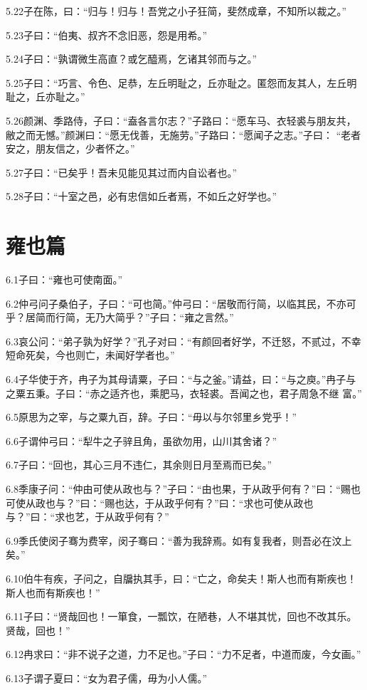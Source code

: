 \documentclass[a4paper,12pt,UTF8,twoside]{ctexbook}
\begin{document}
5.22子在陈，曰：“归与！归与！吾党之小子狂简，斐然成章，不知所以裁之。”

5.23子曰：“伯夷、叔齐不念旧恶，怨是用希。”

5.24子曰：“孰谓微生高直？或乞醯焉，乞诸其邻而与之。”

5.25子曰：“巧言、令色、足恭，左丘明耻之，丘亦耻之。匿怨而友其人，左丘明耻之，丘亦耻之。”

5.26颜渊、季路侍，子曰：“盍各言尔志？”子路曰：“愿车马、衣轻裘与朋友共，敝之而无憾。”颜渊曰：“愿无伐善，无施劳。”子路曰：“愿闻子之志。”子曰：
“老者安之，朋友信之，少者怀之。”

5.27子曰：“已矣乎！吾未见能见其过而内自讼者也。”

5.28子曰：“十室之邑，必有忠信如丘者焉，不如丘之好学也。”


\chapter{雍也篇}
6.1子曰：“雍也可使南面。”

6.2仲弓问子桑伯子，子曰：“可也简。”仲弓曰：“居敬而行简，以临其民，不亦可乎？居简而行简，无乃大简乎？”子曰：“雍之言然。”

6.3哀公问：“弟子孰为好学？”孔子对曰：“有颜回者好学，不迁怒，不贰过，不幸短命死矣，今也则亡，未闻好学者也。”

6.4子华使于齐，冉子为其母请粟，子曰：“与之釜。”请益，曰：“与之庾。”冉子与之粟五秉。子曰：“赤之适齐也，乘肥马，衣轻裘。吾闻之也，君子周急不继
富。”

6.5原思为之宰，与之粟九百，辞。子曰：“毋以与尔邻里乡党乎！”

6.6子谓仲弓曰：“犁牛之子骍且角，虽欲勿用，山川其舍诸？”

6.7子曰：“回也，其心三月不违仁，其余则日月至焉而已矣。”

6.8季康子问：“仲由可使从政也与？”子曰：“由也果，于从政乎何有？”曰：“赐也可使从政也与？”曰：“赐也达，于从政乎何有？”曰：“求也可使从政也与？”曰：“求也艺，于从政乎何有？”

6.9季氏使闵子骞为费宰，闵子骞曰：“善为我辞焉。如有复我者，则吾必在汶上矣。”

6.10伯牛有疾，子问之，自牖执其手，曰：“亡之，命矣夫！斯人也而有斯疾也！斯人也而有斯疾也！”

6.11子曰：“贤哉回也！一箪食，一瓢饮，在陋巷，人不堪其忧，回也不改其乐。贤哉，回也！”

6.12冉求曰：“非不说子之道，力不足也。”子曰：“力不足者，中道而废，今女画。”

6.13子谓子夏曰：“女为君子儒，毋为小人儒。”
\end{document}

